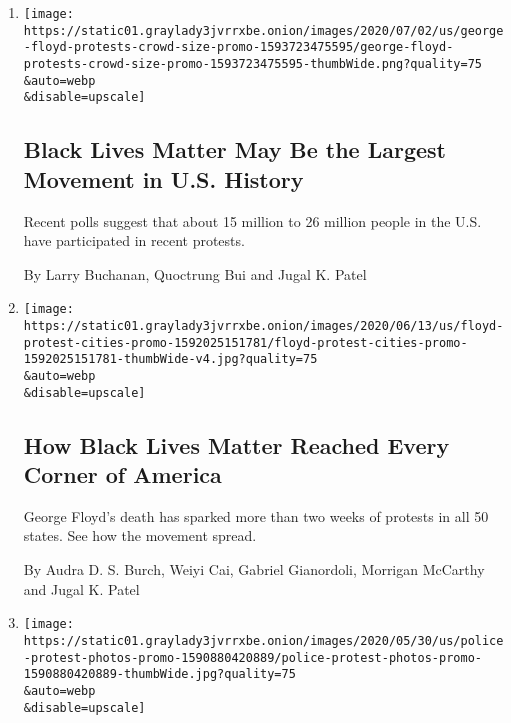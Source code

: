 \begin{enumerate}
\def\labelenumi{\arabic{enumi}.}
\item
  \href{/interactive/2020/07/03/us/george-floyd-protests-crowd-size.html}{}

  \texttt{[image: https://static01.graylady3jvrrxbe.onion/images/2020/07/02/us/george-floyd-protests-crowd-size-promo-1593723475595/george-floyd-protests-crowd-size-promo-1593723475595-thumbWide.png?quality=75\\\&auto=webp\\\&disable=upscale]}

  \hypertarget{black-lives-matter-may-be-the-largest-movement-in-us-history}{%
  \subsection{Black Lives Matter May Be the Largest Movement in U.S.
  History}\label{black-lives-matter-may-be-the-largest-movement-in-us-history}}

  Recent polls suggest that about 15 million to 26 million people in the
  U.S. have participated in recent protests.

  By Larry Buchanan, Quoctrung Bui and Jugal K. Patel
\item
  \href{/interactive/2020/06/13/us/george-floyd-protests-cities-photos.html}{}

  \texttt{[image: https://static01.graylady3jvrrxbe.onion/images/2020/06/13/us/floyd-protest-cities-promo-1592025151781/floyd-protest-cities-promo-1592025151781-thumbWide-v4.jpg?quality=75\\\&auto=webp\\\&disable=upscale]}

  \hypertarget{how-black-lives-matter-reached-every-corner-of-america}{%
  \subsection{How Black Lives Matter Reached Every Corner of
  America}\label{how-black-lives-matter-reached-every-corner-of-america}}

  George Floyd's death has sparked more than two weeks of protests in
  all 50 states. See how the movement spread.

  By Audra D. S. Burch, Weiyi Cai, Gabriel Gianordoli, Morrigan McCarthy
  and Jugal K. Patel
\item
  \href{/interactive/2020/05/30/us/george-floyd-protest-photos.html}{}

  \texttt{[image: https://static01.graylady3jvrrxbe.onion/images/2020/05/30/us/police-protest-photos-promo-1590880420889/police-protest-photos-promo-1590880420889-thumbWide.jpg?quality=75\\\&auto=webp\\\&disable=upscale]}


\end{enumerate}
